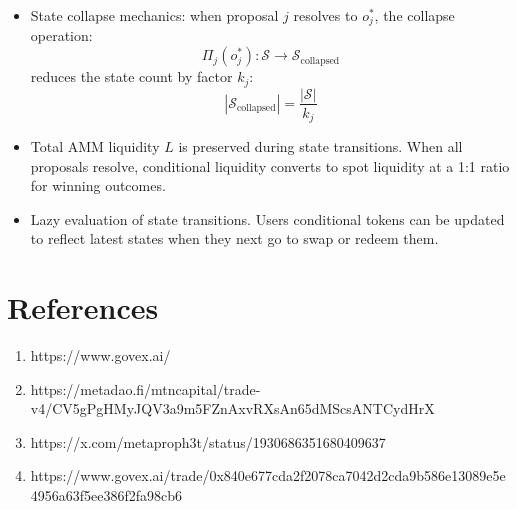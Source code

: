 \documentclass{article}
\begin{document}
\begin{itemize}
    \item State collapse mechanics: when proposal $j$ resolves to $o_j^*$, the collapse operation:
    \begin{equation}
    \Pi_j(o_j^*): \mathcal{S} \rightarrow \mathcal{S}_{\text{collapsed}}
    \end{equation}
    reduces the state count by factor $k_j$:
    \begin{equation}
    |\mathcal{S}_{\text{collapsed}}| = \frac{|\mathcal{S}|}{k_j}
    \end{equation}
    
    \item Total AMM liquidity $L$ is preserved during state transitions. 
    When all proposals resolve, conditional liquidity converts to spot liquidity at a 1:1 ratio for winning outcomes.
    
    \item Lazy evaluation of state transitions. Users conditional tokens can be updated to reflect latest states when they next go to swap or redeem them.
\end{itemize}

\section{References}
\begin{enumerate}
   \item https://www.govex.ai/
   \item https://metadao.fi/mtncapital/trade-v4/CV5gPgHMyJQV3a9m5FZnAxvRXsAn65dMScsANTCydHrX
   \item https://x.com/metaproph3t/status/1930686351680409637
   \item https://www.govex.ai/trade/0x840e677cda2f2078ca7042d2cda9b586e13089e5e4956a63f5ee386f2fa98cb6
\end{enumerate}
\end{document}
